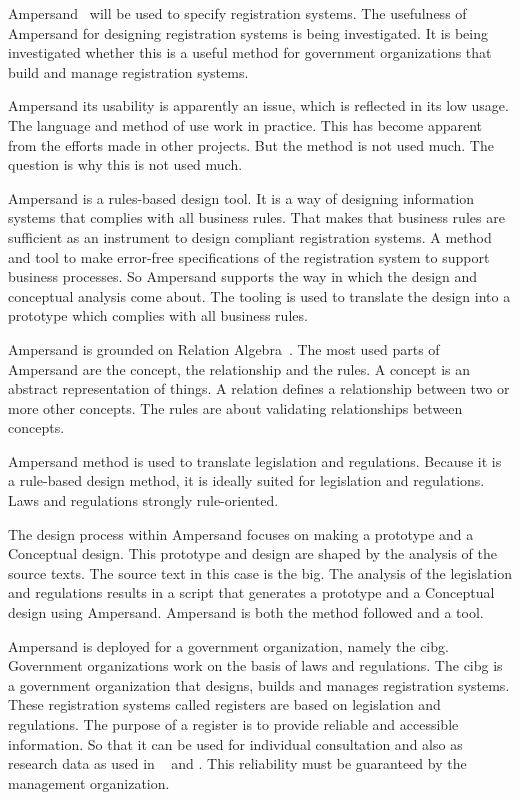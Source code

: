 Ampersand~\citep{joosten_software_2017} will be used to specify registration systems.
The usefulness of Ampersand for designing registration systems is being investigated.
It is being investigated whether this is a useful method for government organizations that build and manage registration systems.

Ampersand its usability is apparently an issue, which is reflected in its low usage.
The language and method of use work in practice. 
This has become apparent from the efforts made in other projects.
But the method is not used much.
The question is why this is not used much.

Ampersand is a rules-based design tool.
It is a way of designing information systems that complies with all business rules.
That makes that business rules are sufficient as an instrument to design compliant registration systems.
A method and tool to make error-free specifications of the registration system to support business processes.
So Ampersand supports the way in which the design and conceptual analysis come about.
The tooling is used to translate the design into a prototype which complies with all business rules.

Ampersand is grounded on Relation Algebra~\citep{maddux_bibliography_2006}.
The most used parts of Ampersand are the concept, the relationship and the rules.
A concept is an abstract representation of things.
A relation defines a relationship between two or more other concepts.
The rules are about validating relationships between concepts.

Ampersand method is used to translate legislation and regulations.
Because it is a rule-based design method, it is ideally suited for legislation and regulations.
Laws and regulations strongly rule-oriented.

The design process within Ampersand focuses on making a prototype and a Conceptual design.
This prototype and design are shaped by the analysis of the source texts.
The source text in this case is the \acrlong{big}.
The analysis of the legislation and regulations results in a script that generates a prototype and a Conceptual design using Ampersand.
Ampersand is both the method followed and a tool.

Ampersand is deployed for a government organization, namely the \acrshort{cibg}.
Government organizations work on the basis of laws and regulations.
The \acrshort{cibg} is a government organization that designs, builds and manages registration systems.
These registration systems called registers are based on legislation and regulations.
The purpose of a register is to provide reliable and accessible information.
So that it can be used for individual consultation and also as research data as used in ~\cite{schmidt_danish_2015} and \cite{bakken_norwegian_2019}.
This reliability must be guaranteed by the management organization.

